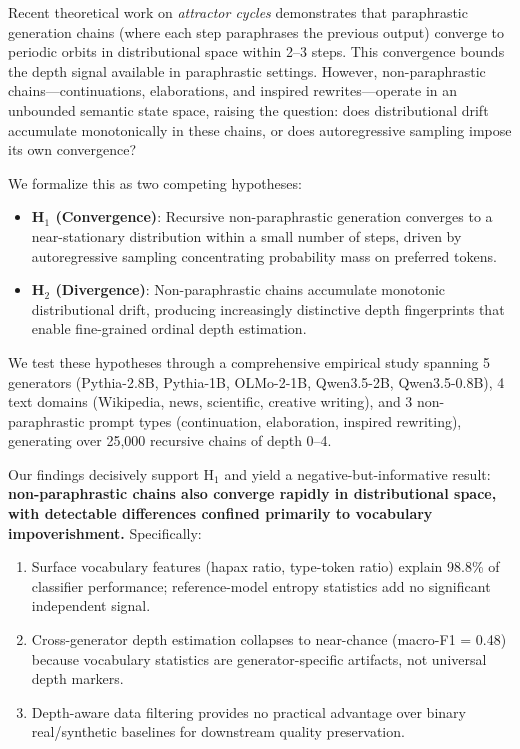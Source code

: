 \documentclass[letterpaper]{article}
\begin{document}
Recent theoretical work on \emph{attractor cycles} \citep{anonymous2025attractor} demonstrates that paraphrastic generation chains (where each step paraphrases the previous output) converge to periodic orbits in distributional space within 2--3 steps. This convergence bounds the depth signal available in paraphrastic settings. However, non-paraphrastic chains---continuations, elaborations, and inspired rewrites---operate in an unbounded semantic state space, raising the question: does distributional drift accumulate monotonically in these chains, or does autoregressive sampling impose its own convergence?

We formalize this as two competing hypotheses:
\begin{itemize}[nosep,leftmargin=*]
    \item \textbf{H$_1$ (Convergence)}: Recursive non-paraphrastic generation converges to a near-stationary distribution within a small number of steps, driven by autoregressive sampling concentrating probability mass on preferred tokens.
    \item \textbf{H$_2$ (Divergence)}: Non-paraphrastic chains accumulate monotonic distributional drift, producing increasingly distinctive depth fingerprints that enable fine-grained ordinal depth estimation.
\end{itemize}

We test these hypotheses through a comprehensive empirical study spanning 5 generators (Pythia-2.8B, Pythia-1B, OLMo-2-1B, Qwen3.5-2B, Qwen3.5-0.8B), 4 text domains (Wikipedia, news, scientific, creative writing), and 3 non-paraphrastic prompt types (continuation, elaboration, inspired rewriting), generating over 25,000 recursive chains of depth 0--4.

Our findings decisively support H$_1$ and yield a negative-but-informative result: \textbf{non-paraphrastic chains also converge rapidly in distributional space, with detectable differences confined primarily to vocabulary impoverishment.} Specifically:
\begin{enumerate}[nosep,leftmargin=*]
    \item Surface vocabulary features (hapax ratio, type-token ratio) explain 98.8\% of classifier performance; reference-model entropy statistics add no significant independent signal.
    \item Cross-generator depth estimation collapses to near-chance (macro-F1 = 0.48) because vocabulary statistics are generator-specific artifacts, not universal depth markers.
    \item Depth-aware data filtering provides no practical advantage over binary real/synthetic baselines for downstream quality preservation.
\end{enumerate}
\end{document}

